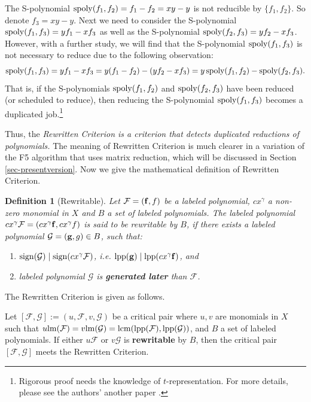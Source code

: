 \documentclass[preprint,authoryear,3p,12pt]{elsarticle}
\newtheorem{define}[theorem]{Definition}
\def\lm{{\rm lm}}
\def\lpp{{\rm lpp}}
\def\fb{{\bf f}}
\def\gb{{\bf g}}
\def\lcm{{\rm lcm}}
\def\sp{{\rm spoly}}
\def\s{{\rm{sign}}}
\begin{document}
The S-polynomial $\sp(f_1, f_2)=f_1-f_2=xy-y$ is not reducible by
$\{f_1, f_2\}$. So denote $f_3=xy-y$. Next we need to consider the
S-polynomial $\sp(f_1, f_3)=yf_1-xf_3$ as well as the S-polynomial
$\sp(f_2, f_3)=yf_2-xf_3$. However, with a further study, we will
find that the S-polynomial $\sp(f_1, f_3)$ is not necessary to
reduce due to the following observation:
$$\sp(f_1, f_3)=yf_1-xf_3 = y(f_1-f_2)-(yf_2-xf_3)= y\, \sp(f_1, f_2)-\sp(f_2, f_3).$$ That is, if the
S-polynomials $\sp(f_1, f_2)$ and $\sp(f_2, f_3)$ have been reduced
(or scheduled to reduce), then reducing the S-polynomial $\sp(f_1,
f_3)$ becomes a duplicated job.\footnote{Rigorous proof needs the
knowledge of $t$-representation. For more details, please see the
authors' another paper \citep{SunWang10}.}

Thus, the {\em Rewritten Criterion is a criterion that detects
duplicated reductions of polynomials.} The meaning of Rewritten
Criterion is much clearer in a variation of the F5 algorithm that
uses matrix reduction, which will be discussed in Section
\ref{sec-presentversion}. Now we give the mathematical definition of
Rewritten Criterion.

\begin{define}[Rewritable]
Let ${\mathcal F}=(\fb, f) $ be a labeled polynomial, $cx^\gamma$ a non-zero monomial in $X$ and $B $ a set of labeled
polynomials. The labeled polynomial $cx^\gamma{\mathcal F}=(cx^{\gamma}\fb, cx^\gamma f)$ is said to be rewritable by $B$, if
there exists a labeled polynomial ${\mathcal G}=(\gb, g)\in B$, such that:
\begin{enumerate}

\item   $\s({\mathcal G})\mid \s(cx^\gamma{\mathcal F})$, i.e. $\lpp(\gb) \mid \lpp(cx^{\gamma}\fb)$, and

\item labeled polynomial ${\mathcal G}$ is {\bf generated later}
than ${\mathcal F}$.

\end{enumerate}
\end{define}

The Rewritten Criterion is given as follows.

\begin{criterion} \caption{\bf --- Rewritten Criterion}
  \smallskip
  \medskip

  \noindent
Let $[{\mathcal F}, {\mathcal G}]:=(u, {\mathcal F}, v, {\mathcal G})$ be a critical pair where $u, v$ are monomials in $X$ such
that $u\lm({\mathcal F})=v\lm({\mathcal G})=\lcm(\lpp({\mathcal F}), \lpp({\mathcal G}))$, and $B $ a set of labeled polynomials.
If either $u{\mathcal F}$ or $v{\mathcal G}$ is {\bf rewritable} by $B$, then the critical pair $[{\mathcal F}, {\mathcal G}]$
meets the Rewritten Criterion.
  \medskip
\end{criterion}
\end{document}
